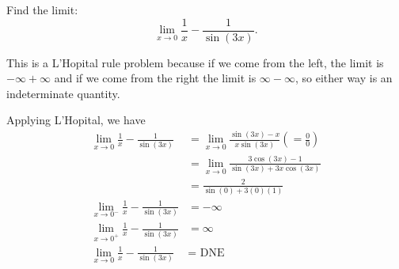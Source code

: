 \documentclass{ximera}
\author{Emma Smith Zbarsky}
\begin{document}
\begin{exercise}

Find the limit: \[\lim_{x \to 0} \frac{1}{x} - \frac{1}{\sin(3x)}.\]


\begin{hint}
This is a L'Hopital rule problem because if we come from the left, the
limit is $-\infty + \infty$ and if we come from the right the limit is
$\infty - \infty$, so either way is an indeterminate quantity.
\end{hint}


\begin{hint}
Applying L'Hopital, we have \begin{align*}
\lim_{x\to 0} \frac{1}{x} - \frac{1}{\sin(3x)} &= \lim_{x\to 0} \frac{\sin(3x)-x}{x\sin(3x)} \left(=\frac{0}{0}\right) \\
&= \lim_{x\to 0} \frac{3\cos(3x)-1}{\sin(3x)+3x\cos(3x)} \\
&= \frac{2}{\sin(0)+3(0)(1)} \\
\lim_{x\to 0^-} \frac{1}{x}-\frac{1}{\sin(3x)} &= -\infty \\
\lim_{x\to 0^+} \frac{1}{x}-\frac{1}{\sin(3x)} &= \infty \\
\lim_{x\to 0} \frac{1}{x}-\frac{1}{\sin(3x)} &= \mbox{ DNE} \end{align*}
\end{hint}


\begin{multipleChoice}
\choice{$-\infty$}
\choice{$\infty$}
\end{multipleChoice}

\end{exercise}
\end{document}
